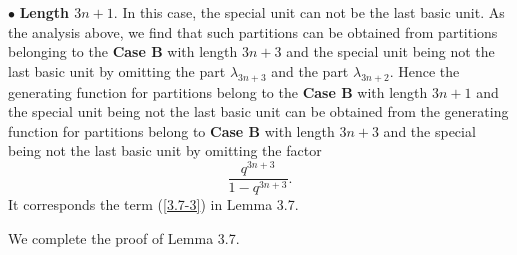 \documentclass[draft]{amsart}
\numberwithin{equation}{section}
\theoremstyle{plain}
\theoremstyle{remark}
\begin{document}
$\bullet$ {\bf Length $3n+1.$}
In this case, the special unit can not be the last basic unit.  As the analysis above, we find that such partitions can be obtained from partitions belonging to the {\bf Case B} with length $3n+3$  and the special unit being not the last basic unit by omitting the part $\lambda_{3n+3}$ and the part $\lambda_{3n+2}$. Hence the generating function for partitions belong to the {\bf Case B} with length $3n+1$ and the special unit being not the last basic unit can be obtained from the generating function for partitions belong to {\bf Case B}  with length $3n+3$ and the special being not the last basic unit  by omitting the factor $$\frac{q^{3n+3}}{1-q^{3n+3}}.$$
 It corresponds the term (\ref{3.7-3}) in Lemma 3.7.

We complete the proof of Lemma 3.7.
\end{document}
